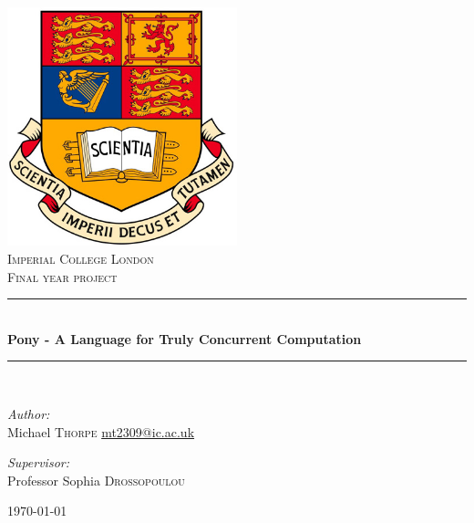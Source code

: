 \documentclass[pdftex,11pt,a4paper]{report}
\newcommand{\HRule}{\rule{\linewidth}{0.5mm}}
\begin{document}
\begin{titlepage}

\begin{center}

\includegraphics[width=0.50\textwidth]{imperial_crest_colour.jpg}\\[1cm]

\textsc{\LARGE Imperial College London}\\[1.5cm]

\textsc{\Large Final year project}\\[0.5cm]


\HRule \\[0.4cm]
{ \huge \bfseries Pony - A Language for Truly Concurrent Computation}\\[0.4cm]

\HRule \\[1.5cm]

\begin{minipage}{0.4\textwidth}
\begin{flushleft} \large
\emph{Author:}\\
Michael \textsc{Thorpe}
\href{mailto:mt2309@ic.ac.uk}{mt2309@ic.ac.uk}
\end{flushleft}
\end{minipage}
\begin{minipage}{0.4\textwidth}
\begin{flushright} \large
\emph{Supervisor:} \\
Professor Sophia \textsc{Drossopoulou}
\end{flushright}
\end{minipage}

\vfill

{\large \today}

\end{center}

\end{titlepage}
\end{document}
